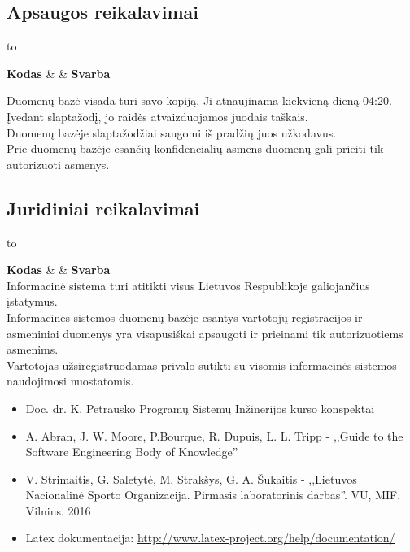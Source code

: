 \documentclass{VUMIFPSkursinis}
\begin{document}
\subsection*{Apsaugos reikalavimai}
  \begin{longtabu} to 
    \caption{Apsaugos reikalavimai}
    \label{table:apsaugosReikalavimai}
    \endfirsthead
    \endhead
    \hline
    \textbf{Kodas} &  & \textbf{Svarba} \\
    \hline
	
    {
      Duomenų bazė visada turi savo kopiją. Ji atnaujinama kiekvieną dieną 04:20. \\
      Įvedant slaptažodį, jo raidės atvaizduojamos juodais taškais. \\
      Duomenų bazėje slaptažodžiai saugomi iš pradžių juos užkodavus. \\
      Prie duomenų bazėje esančių konfidencialių asmens duomenų gali prieiti tik autorizuoti asmenys. 
    }
	
  \end{longtabu}  

\subsection*{Juridiniai reikalavimai}
  \begin{longtabu} to 
    \caption{Juridiniai reikalavimai}
    \label{table:juridiniaiReikalavimai}
    \endfirsthead
    \endhead
    \hline
    \textbf{Kodas} &  & \textbf{Svarba} \\
    \hline
    {
      Informacinė sistema turi atitikti visus Lietuvos Respublikoje galiojančius įstatymus.\\
      Informacinės sistemos duomenų bazėje esantys vartotojų registracijos ir asmeniniai duomenys yra visapusiškai apsaugoti ir prieinami tik autorizuotiems asmenims.\\
      Vartotojas užsiregistruodamas privalo sutikti su visomis informacinės sistemos naudojimosi nuostatomis.
    }
  \end{longtabu}  
 \label{literaturosSarasas}
	\begin{itemize}
    \item Doc. dr. K. Petrausko Programų Sistemų Inžinerijos kurso konspektai
    \item A. Abran, J. W. Moore, P.Bourque, R. Dupuis, L. L. Tripp - ,,Guide to the Software Engineering Body of Knowledge''
    \item V. Strimaitis, G. Saletytė, M. Strakšys, G. A. Šukaitis - ,,Lietuvos Nacionalinė Sporto Organizacija. Pirmasis laboratorinis darbas''. VU, MIF, Vilnius. 2016
	  \item Latex dokumentacija: \url{http://www.latex-project.org/help/documentation/}
  \end{itemize}
\end{document}
